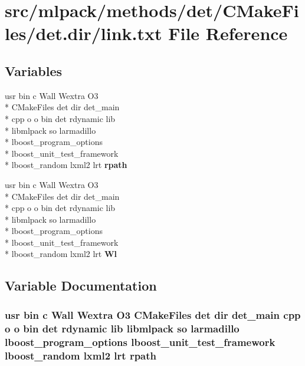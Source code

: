 \section{src/mlpack/methods/det/\-C\-Make\-Files/det.dir/link.txt File Reference}
\label{methods_2det_2CMakeFiles_2det_8dir_2link_8txt}
\subsection*{Variables}
\begin{DoxyCompactItemize}
\item 
usr bin c Wall Wextra O3 \\*
C\-Make\-Files det dir det\-\_\-main \\*
cpp o o bin det rdynamic lib \\*
libmlpack so larmadillo \\*
lboost\-\_\-program\-\_\-options \\*
lboost\-\_\-unit\-\_\-test\-\_\-framework \\*
lboost\-\_\-random lxml2 lrt {\bf rpath}
\item 
usr bin c Wall Wextra O3 \\*
C\-Make\-Files det dir det\-\_\-main \\*
cpp o o bin det rdynamic lib \\*
libmlpack so larmadillo \\*
lboost\-\_\-program\-\_\-options \\*
lboost\-\_\-unit\-\_\-test\-\_\-framework \\*
lboost\-\_\-random lxml2 lrt {\bf Wl}
\end{DoxyCompactItemize}


\subsection{Variable Documentation}
\subsubsection[{rpath}]{\setlength{\rightskip}{0pt plus 5cm}usr bin c Wall Wextra O3 C\-Make\-Files det dir det\-\_\-main cpp o o bin det rdynamic lib libmlpack so larmadillo lboost\-\_\-program\-\_\-options lboost\-\_\-unit\-\_\-test\-\_\-framework lboost\-\_\-random lxml2 lrt rpath}\label{methods_2det_2CMakeFiles_2det_8dir_2link_8txt_adf770ca9af40e62519e179f5ca8160d7}


